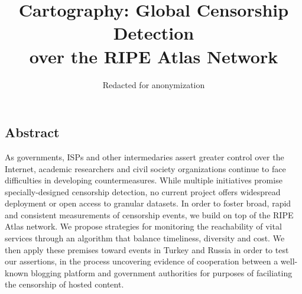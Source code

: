 \documentclass[letterpaper,twocolumn,10pt]{article}
\begin{document}
\date{}

\title{
	\Large \bf Cartography: Global Censorship Detection \\
	over the RIPE Atlas Network
}

\author{
	Redacted for anonymization
}

\maketitle

\thispagestyle{empty}

\subsection*{Abstract}

As governments, ISPs and other intermedaries assert greater control over the
Internet, academic researchers and civil society organizations continue to face
difficulties in developing countermeasures.  While multiple initiatives promise
specially-designed censorship detection, no current project offers widespread
deployment or open access to granular datasets.
%
In order to foster broad, rapid and consistent measurements of censorship
events, we build on top of the RIPE Atlas network.  We propose strategies for
monitoring the reachability of vital services through an algorithm that balance
timeliness, diversity and cost.  We then apply these premises toward events in
Turkey and Russia in order to test our assertions, in the process uncovering
evidence of cooperation between a well-known blogging platform and government
authorities for purposes of faciliating the censorship of hosted content.








% 



%



% 

\raggedright
\printbibliography

\end{document}
